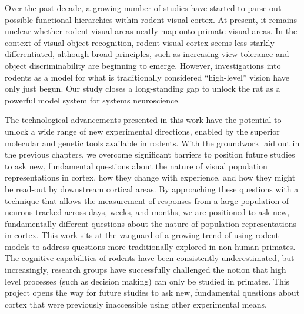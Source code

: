 Over the past decade, a growing number of studies have started to parse out possible functional hierarchies within rodent visual cortex. At present, it remains unclear whether rodent visual areas neatly map onto primate visual areas. In the context of visual object recognition, rodent visual cortex seems less starkly differentiated, although broad principles, such as increasing view tolerance and object discriminability are beginning to emerge. However, investigations into rodents as a model for what is traditionally considered ``high-level'' vision have only just begun. Our study closes a long-standing gap to unlock the rat as a powerful model system for systems neuroscience. 

The technological advancements presented in this work have the potential to unlock a wide range of new experimental directions, enabled by the superior molecular and genetic tools available in rodents. With the groundwork laid out in the previous chapters, we overcome significant barriers to position future studies to ask new, fundamental questions about the nature of visual population representations in cortex, how they change with experience, and how they might be read-out by downstream cortical areas. By approaching these questions with a technique that allows the measurement of responses from a large population of neurons tracked across days, weeks, and months, we are positioned to ask new, fundamentally different questions about the nature of population representations in cortex. This work sits at the vanguard of a growing trend of using rodent models to address questions more traditionally explored in non-human primates.  The cognitive capabilities of rodents have been consistently underestimated, but increasingly, research groups have successfully challenged the notion that high level processes (such as decision making) can only be studied in primates. This project opens the way for future studies to ask new, fundamental questions about cortex that were previously inaccessible using other experimental means. 